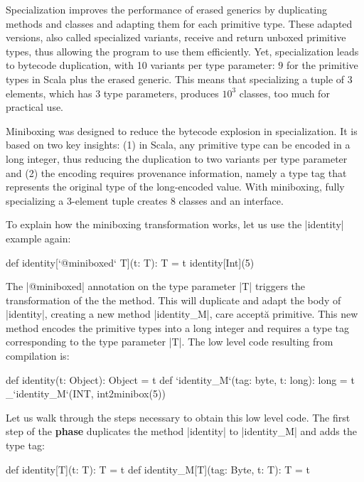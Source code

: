 Specialization \cite{iuli-thesis} improves the performance of erased generics by duplicating methods and classes and adapting them for each primitive type. These adapted versions, also called specialized variants, receive and return unboxed primitive types, thus allowing the program to use them efficiently. Yet, specialization leads to bytecode duplication, with 10 variants per type parameter: $9$ for the primitive types in Scala plus the erased generic. This means that specializing a tuple of 3 elements, which has $3$ type parameters, produces $10^3$ classes, too much for practical use.

Miniboxing was designed to reduce the bytecode explosion in specialization. It is based on two key insights: (1) in Scala, any primitive type can be encoded in a long integer, thus reducing the duplication to two variants per type parameter and (2) the encoding requires provenance information, namely a type tag that represents the original type of the long-encoded value. With miniboxing, fully specializing a 3-element tuple creates 8 classes and an interface.

To explain how the miniboxing transformation works, let us use the |identity| example again:

\begin{lstlisting-nobreak}
 def identity[`@miniboxed` T](t: T): T = t
 identity[Int](5)
\end{lstlisting-nobreak}

The |@miniboxed| annotation on the type parameter |T| triggers the transformation of the the method. This will duplicate and adapt the body of |identity|, creating a new method |identity_M|, care accept\u{a} primitive. This new method encodes the primitive types into a long integer and requires a type tag corresponding to the type parameter |T|. The low level code resulting from compilation is:

\begin{lstlisting-nobreak}
 def identity(t: Object): Object = t
 def `identity_M`(tag: byte, t: long): long = t
_`identity_M`(INT, int2minibox(5))
\end{lstlisting-nobreak}

Let us walk through the steps necessary to obtain this low level code. The first step of the \textbf{\inject{} phase} duplicates the method |identity| to |identity_M| and adds the type tag:

\begin{lstlisting-nobreak}
 def identity[T](t: T): T = t
 def identity_M[T](tag: Byte, t: T): T = t
\end{lstlisting-nobreak}

